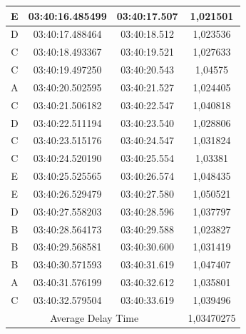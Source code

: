 \begin{table}[htpb]
\begin{tabular}{|ccc|c|}
  \multicolumn{1}{|c|}{E}    & \multicolumn{1}{c|}{03:40:16.485499} & 03:40:17.507       & 1,021501   \\ \hline
  \multicolumn{1}{|c|}{D}    & \multicolumn{1}{c|}{03:40:17.488464} & 03:40:18.512       & 1,023536   \\ \hline
  \multicolumn{1}{|c|}{C}    & \multicolumn{1}{c|}{03:40:18.493367} & 03:40:19.521       & 1,027633   \\ \hline
  \multicolumn{1}{|c|}{C}    & \multicolumn{1}{c|}{03:40:19.497250} & 03:40:20.543       & 1,04575    \\ \hline
  \multicolumn{1}{|c|}{A}    & \multicolumn{1}{c|}{03:40:20.502595} & 03:40:21.527       & 1,024405   \\ \hline
  \multicolumn{1}{|c|}{C}    & \multicolumn{1}{c|}{03:40:21.506182} & 03:40:22.547       & 1,040818   \\ \hline
  \multicolumn{1}{|c|}{D}    & \multicolumn{1}{c|}{03:40:22.511194} & 03:40:23.540       & 1,028806   \\ \hline
  \multicolumn{1}{|c|}{C}    & \multicolumn{1}{c|}{03:40:23.515176} & 03:40:24.547       & 1,031824   \\ \hline
  \multicolumn{1}{|c|}{C}    & \multicolumn{1}{c|}{03:40:24.520190} & 03:40:25.554       & 1,03381    \\ \hline
  \multicolumn{1}{|c|}{E}    & \multicolumn{1}{c|}{03:40:25.525565} & 03:40:26.574       & 1,048435   \\ \hline
  \multicolumn{1}{|c|}{E}    & \multicolumn{1}{c|}{03:40:26.529479} & 03:40:27.580       & 1,050521   \\ \hline
  \multicolumn{1}{|c|}{D}    & \multicolumn{1}{c|}{03:40:27.558203} & 03:40:28.596       & 1,037797   \\ \hline
  \multicolumn{1}{|c|}{B}    & \multicolumn{1}{c|}{03:40:28.564173} & 03:40:29.588       & 1,023827   \\ \hline
  \multicolumn{1}{|c|}{B}    & \multicolumn{1}{c|}{03:40:29.568581} & 03:40:30.600       & 1,031419   \\ \hline
  \multicolumn{1}{|c|}{B}    & \multicolumn{1}{c|}{03:40:30.571593} & 03:40:31.619       & 1,047407   \\ \hline
  \multicolumn{1}{|c|}{A}    & \multicolumn{1}{c|}{03:40:31.576199} & 03:40:32.612       & 1,035801   \\ \hline
  \multicolumn{1}{|c|}{C}    & \multicolumn{1}{c|}{03:40:32.579504} & 03:40:33.619       & 1,039496   \\ \hline
  \multicolumn{3}{|c|}{Average Delay Time}                                               & 1,03470275 \\ \hline
  \end{tabular}
\end{table}

